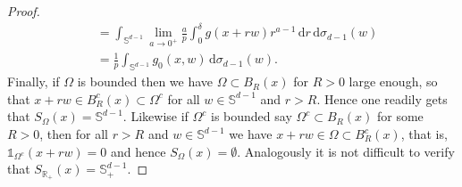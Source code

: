 \documentclass[12pt, reqno]{amsart}%
\theoremstyle{plain}  %
\theoremstyle{definition}  %
\theoremstyle{remark}
\numberwithin{equation}{section}
\DeclareMathOperator{\R}{\mathbb{R}}
\renewcommand{\d}{\,\mathrm{d}}
\begin{document}
\begin{proof}
\begin{align*}
&= 
\int_{\mathbb{S}^{d-1}}  \lim_{a \to 0^+}\frac{a}{p} \int_0^\delta  g(x+r w)   r^{a-1}\d r \d \sigma_{d-1}(w) \\
&=  \frac{1}{p} \int_{\mathbb{S}^{d-1}} g_0(x,w)\d\sigma_{d-1}(w).
\end{align*}
Finally, if $\Omega$ is bounded then  we have $ \Omega\subset B_R(x)$  for $R>0$ large enough, so that $x+rw\in B_R^c(x)\subset \Omega^c$ for all $w\in \mathbb{S}^{d-1}$ and $r>R.$ Hence one readily gets that  $S_\Omega(x) =\mathbb{S}^{d-1}$. Likewise if $\Omega^c$ is bounded  say $\Omega^c \subset B_R(x)$ for some $R>0$, then for all $r>R$ and $w\in \mathbb{S}^{d-1}$ we have $x+rw\in \Omega\subset B_R^c(x)$, that is, $\mathds{1}_{\Omega^c}(x+rw)=0$  and hence $S_\Omega(x)= \emptyset$. Analogously it is not difficult to verify that $S_{\R_+}(x)=\mathbb{S}^{d-1}_+$.
\end{proof}
\end{document}
